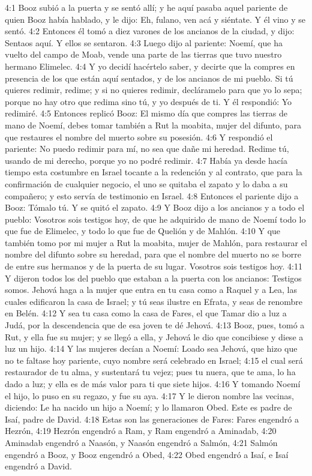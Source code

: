 4:1 Booz subió a la puerta y se sentó allí; y he aquí pasaba aquel pariente de quien Booz había hablado, y le dijo: Eh, fulano, ven acá y siéntate. Y él vino y se sentó.  
4:2 Entonces él tomó a diez varones de los ancianos de la ciudad, y dijo: Sentaos aquí. Y ellos se sentaron.  
4:3 Luego dijo al pariente: Noemí, que ha vuelto del campo de Moab, vende una parte de las tierras que tuvo nuestro hermano Elimelec.  
4:4 Y yo decidí hacértelo saber, y decirte que la compres en presencia de los que están aquí sentados, y de los ancianos de mi pueblo. Si tú quieres redimir, redime; y si no quieres redimir, decláramelo para que yo lo sepa; porque no hay otro que redima sino tú, y yo después de ti. Y él respondió: Yo redimiré.  
4:5 Entonces replicó Booz: El mismo día que compres las tierras de mano de Noemí, debes tomar también a Rut la moabita, mujer del difunto, para que restaures el nombre del muerto sobre su posesión.  
4:6 Y respondió el pariente: No puedo redimir para mí, no sea que dañe mi heredad. Redime tú, usando de mi derecho, porque yo no podré redimir.  
4:7 Había ya desde hacía tiempo esta costumbre en Israel tocante a la redención y al contrato, que para la confirmación de cualquier negocio, el uno se quitaba el zapato y lo daba a su compañero; y esto servía de testimonio en Israel.  
4:8 Entonces el pariente dijo a Booz: Tómalo tú. Y se quitó el zapato. 
4:9 Y Booz dijo a los ancianos y a todo el pueblo: Vosotros sois testigos hoy, de que he adquirido de mano de Noemí todo lo que fue de Elimelec, y todo lo que fue de Quelión y de Mahlón.  
4:10 Y que también tomo por mi mujer a Rut la moabita, mujer de Mahlón, para restaurar el nombre del difunto sobre su heredad, para que el nombre del muerto no se borre de entre sus hermanos y de la puerta de su lugar. Vosotros sois testigos hoy.  
4:11 Y dijeron todos los del pueblo que estaban a la puerta con los ancianos: Testigos somos. Jehová haga a la mujer que entra en tu casa como a Raquel y a Lea, las cuales edificaron la casa de Israel; y tú seas ilustre en Efrata, y seas de renombre en Belén.  
4:12 Y sea tu casa como la casa de Fares, el que Tamar dio a luz a Judá, por la descendencia que de esa joven te dé Jehová.  
4:13 Booz, pues, tomó a Rut, y ella fue su mujer; y se llegó a ella, y Jehová le dio que concibiese y diese a luz un hijo.  
4:14 Y las mujeres decían a Noemí: Loado sea Jehová, que hizo que no te faltase hoy pariente, cuyo nombre será celebrado en Israel;  
4:15 el cual será restaurador de tu alma, y sustentará tu vejez; pues tu nuera, que te ama, lo ha dado a luz; y ella es de más valor para ti que siete hijos.  
4:16 Y tomando Noemí el hijo, lo puso en su regazo, y fue su aya.  
4:17 Y le dieron nombre las vecinas, diciendo: Le ha nacido un hijo a Noemí; y lo llamaron Obed. Este es padre de Isaí, padre de David.  
4:18 Estas son las generaciones de Fares: Fares engendró a Hezrón,  
4:19 Hezrón engendró a Ram, y Ram engendró a Aminadab,  
4:20 Aminadab engendró a Naasón, y Naasón engendró a Salmón,  
4:21 Salmón engendró a Booz, y Booz engendró a Obed,  
4:22 Obed engendró a Isaí, e Isaí engendró a David.
